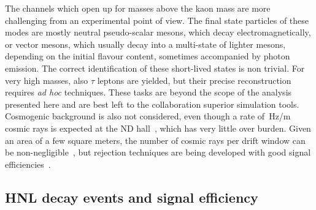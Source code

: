 The channels which open up for masses above the kaon mass are more challenging from an experimental point of view.
The final state particles of these modes are mostly neutral pseudo-scalar mesons, which decay electromagnetically, %
or vector mesons, which usually decay into a multi-state of lighter mesons, depending on the initial flavour content,
sometimes accompanied by photon emission.
The correct identification of these short-lived states is non trivial.
For very high masses, also $\tau$ leptons are yielded, but their precise reconstruction requires \emph{ad hoc} techniques.
These tasks are beyond the scope of the analysis presented here and are best left to the collaboration superior simulation tools.
Cosmogenic background is also not considered, even though a rate of \,Hz/m cosmic rays %
is expected at the ND hall~\cite{Abi:2020wmh}, which has very little over burden.
Given an area of a few square meters, the number of cosmic rays per drift window can be non-negligible~\cite{Abi:2018dnh}, %
but rejection techniques are being developed with good signal efficiencies~\cite{Adams:2018lzd}.


%
\subsection{HNL decay events and signal efficiency}
\label{sec:numevt}

